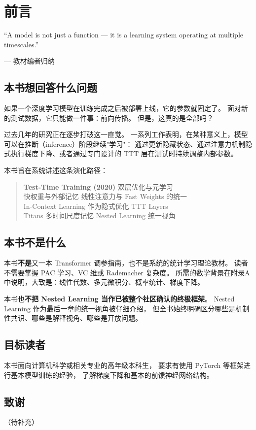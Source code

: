 \chapter*{前言}

\epigraph{%
  ``A model is not just a function — it is a learning system operating at multiple timescales.''
}{--- 教材编者归纳}

\section*{本书想回答什么问题}

如果一个深度学习模型在训练完成之后被部署上线，它的参数就固定了。
面对新的测试数据，它只能做一件事：前向传播。
但是，这真的是全部吗？

过去几年的研究正在逐步打破这一直觉。
一系列工作表明，在某种意义上，模型可以在推断（inference）阶段继续"学习"：
通过更新隐藏状态、通过注意力机制隐式执行梯度下降、或者通过专门设计的 TTT 层在测试时持续调整内部参数。

本书旨在系统讲述这条演化路径：
\begin{quote}
  \textbf{Test-Time Training (2020)} \textrightarrow{} 双层优化与元学习 \textrightarrow{}\\
  快权重与外部记忆 \textrightarrow{} 线性注意力与 Fast Weights 的统一 \textrightarrow{}\\
  In-Context Learning 作为隐式优化 \textrightarrow{} TTT Layers \textrightarrow{}\\
  Titans 多时间尺度记忆 \textrightarrow{} Nested Learning 统一视角
\end{quote}

\section*{本书不是什么}

本书\textbf{不是}又一本 Transformer 调参指南，也不是系统的统计学习理论教材。
读者不需要掌握 PAC 学习、VC 维或 Rademacher 复杂度。
所需的数学背景在附录A中说明，大致是：线性代数、多元微积分、概率统计、梯度下降。

本书也\textbf{不把 Nested Learning 当作已被整个社区确认的终极框架}。
Nested Learning 作为最后一章的统一视角被仔细介绍，
但全书始终明确区分哪些是机制性共识、哪些是解释视角、哪些是开放问题。

\section*{目标读者}

本书面向计算机科学或相关专业的高年级本科生，
要求有使用 PyTorch 等框架进行基本模型训练的经验，
了解梯度下降和基本的前馈神经网络结构。

\section*{致谢}

（待补充）
